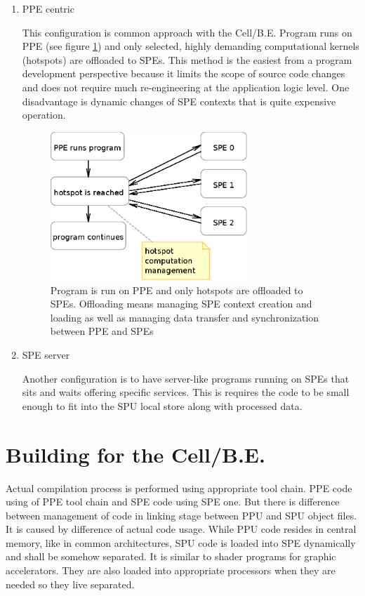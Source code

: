 \begin{enumerate}
\item PPE centric
\par
This configuration is common approach with the \mbox{Cell/B.E.}
Program runs on PPE (see figure \ref{fg:PPUCentricModel}) and only selected, highly demanding computational kernels (hotspots) are offloaded to SPEs.
This method is the easiest from a program development perspective because it limits the scope of source code changes and does not require much re-engineering at the application logic level.
One disadvantage is dynamic changes of SPE contexts that is quite expensive operation.

\begin{figure}
    \centering
    \includegraphics[width=0.7\textwidth]{data/PPUCentricModel}
    \caption[PPE centric configuration]{Program is run on PPE and only hotspots are offloaded to SPEs.
 Offloading means managing SPE context creation and loading as well as managing data transfer and synchronization between PPE and SPEs}
    \label{fg:PPUCentricModel}
\end{figure}

\item SPE server
\par
Another configuration is to have server-like programs running on SPEs that sits and waits offering specific services.
This is requires the code to be small enough to fit into the SPU local store along with processed data.

\end{enumerate}

\section {Building for the \mbox{Cell/B.E.}}
\par
Actual compilation process is performed using appropriate tool chain.
PPE code using of PPE tool chain and SPE code using SPE one.
But there is difference between management of code in linking stage between PPU and SPU object files.
It is caused by difference of actual code usage.
While PPU code resides in central memory, like in common architectures, SPU code is loaded into SPE dynamically and shall be somehow separated.
It is similar to shader programs for graphic accelerators.
They are also loaded into appropriate processors when they are needed so they live separated.

